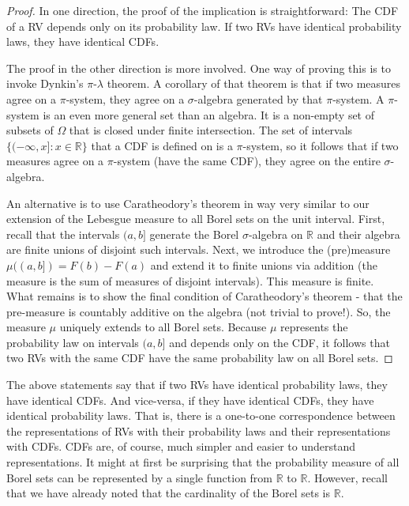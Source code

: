 \documentclass{book}
\theoremstyle{plain}%
\theoremstyle{definition}
\begin{document}
\begin{proof}
In one direction, the proof of the implication is straightforward: The CDF of a RV depends only on its probability law. If two RVs have identical probability laws, they have identical CDFs.

The proof in the other direction is more involved. One way of proving this is to invoke Dynkin's $\pi$-$\lambda$ theorem. A corollary of that theorem is that if two measures agree on a $\pi$-system, they agree on a $\sigma$-algebra generated by that $\pi$-system. A $\pi$-system is an even more general set than an algebra. It is a non-empty set of subsets of $\Omega$ that is closed under finite intersection. The set of intervals $\{(-\infty, x]: x\in \mathbb{R} \}$ that a CDF is defined on is a $\pi$-system, so it follows that if two measures agree on a $\pi$-system (have the same CDF), they agree on the entire $\sigma$-algebra.

An alternative is to use Caratheodory's theorem in way very similar to our extension of the Lebesgue measure to all Borel sets on the unit interval. First, recall that the intervals $(a, b]$ generate the Borel $\sigma$-algebra on $\mathbb{R}$ and their algebra are finite unions of disjoint such intervals. Next, we introduce the (pre)measure $\mu((a,b]) = F(b) - F(a)$ and extend it to finite unions via addition (the measure is the sum of measures of disjoint intervals). This measure is finite. What remains is to show the final condition of Caratheodory's theorem - that the pre-measure is countably additive on the algebra (not trivial to prove!). So, the measure $\mu$ uniquely extends to all Borel sets. Because $\mu$ represents the probability law on intervals $(a, b]$ and depends only on the CDF, it follows that two RVs with the same CDF have the same probability law on all Borel sets.
\end{proof}

The above statements say that if two RVs have identical probability laws, they have identical CDFs. And vice-versa, if they have identical CDFs, they have identical probability laws. That is, there is a one-to-one correspondence between the representations of RVs with their probability laws and their representations with CDFs. CDFs are, of course, much simpler and easier to understand representations. It might at first be surprising that the probability measure of all Borel sets can be represented by a single function from $\mathbb{R}$ to $\mathbb{R}$. However, recall that we have already noted that the cardinality of the Borel sets is $\mathbb{R}$.
\end{document}
